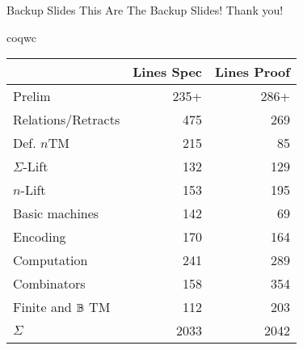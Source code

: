 
\begin{frame}{Backup Slides}
  This Are The Backup Slides!
  \vfill
  Thank you!
\end{frame}

\begin{frame}{coqwc}
	\begin{table}
		\begin{tabular}{|l|r|r|}
			\hline
			& Lines Spec & Lines Proof\tabularnewline
			\hline
			Prelim & 235+ & 286+\tabularnewline
			Relations/Retracts & 475 & 269\tabularnewline
			Def. $n$TM & 215 & 85\tabularnewline
			$\Sigma$-Lift & 132 & 129\tabularnewline
			$n$-Lift & 153 & 195\tabularnewline
			Basic machines & 142 & 69\tabularnewline
			Encoding & 170 & 164\tabularnewline
			Computation & 241 & 289\tabularnewline
			Combinators & 158 & 354\tabularnewline
			Finite and $\mathbb{B}$ TM & 112 & 203\tabularnewline
			\hline
			$\Sigma$ & 2033 & 2042\tabularnewline
			\hline
		\end{tabular}
	\end{table}
\end{frame}



